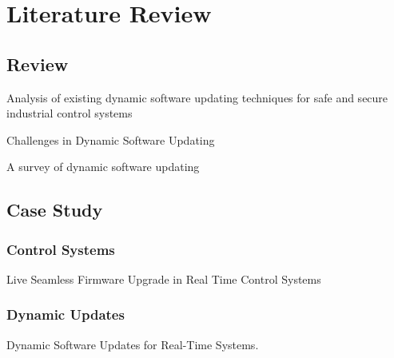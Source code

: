 \chapter{Literature Review}



\section{Review}
Analysis of existing dynamic software updating techniques for safe and secure industrial control systems

Challenges in Dynamic Software Updating

A survey of dynamic software updating

\newpage

\section{Case Study}

\subsection{Control Systems}
Live Seamless Firmware Upgrade in Real Time Control Systems 

\subsection{Dynamic Updates}
Dynamic Software Updates for Real-Time Systems.

